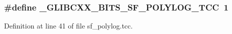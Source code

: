 \subsubsection[{\texorpdfstring{\+\_\+\+G\+L\+I\+B\+C\+X\+X\+\_\+\+B\+I\+T\+S\+\_\+\+S\+F\+\_\+\+P\+O\+L\+Y\+L\+O\+G\+\_\+\+T\+CC}{_GLIBCXX_BITS_SF_POLYLOG_TCC}}]{\setlength{\rightskip}{0pt plus 5cm}\#define \+\_\+\+G\+L\+I\+B\+C\+X\+X\+\_\+\+B\+I\+T\+S\+\_\+\+S\+F\+\_\+\+P\+O\+L\+Y\+L\+O\+G\+\_\+\+T\+CC~1}\hypertarget{sf__polylog_8tcc_ab6c10ff949c404f48f72645a3fe8a674}{}\label{sf__polylog_8tcc_ab6c10ff949c404f48f72645a3fe8a674}


Definition at line 41 of file sf\+\_\+polylog.\+tcc.

